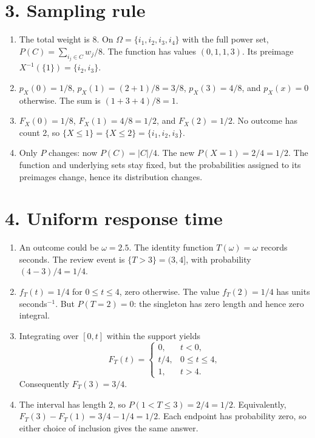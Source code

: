 \documentclass[11pt,a4paper]{article}
\begin{document}
\clearpage
\section*{3. Sampling rule}
\begin{enumerate}
\item The total weight is 8. On $\Omega=\{i_1,i_2,i_3,i_4\}$ with the full power set, $P(C)=\sum_{i_j\in C}w_j/8$. The function has values $(0,1,1,3)$. Its preimage $X^{-1}(\{1\})=\{i_2,i_3\}$.
\item $p_X(0)=1/8$, $p_X(1)=(2+1)/8=3/8$, $p_X(3)=4/8$, and $p_X(x)=0$ otherwise. The sum is $(1+3+4)/8=1$.
\item $F_X(0)=1/8$, $F_X(1)=4/8=1/2$, and $F_X(2)=1/2$. No outcome has count 2, so $\{X\le1\}=\{X\le2\}=\{i_1,i_2,i_3\}$.
\item Only $P$ changes: now $P(C)=|C|/4$. The new $P(X=1)=2/4=1/2$. The function and underlying sets stay fixed, but the probabilities assigned to its preimages change, hence its distribution changes.
\end{enumerate}

\section*{4. Uniform response time}
\begin{enumerate}
\item An outcome could be $\omega=2.5$. The identity function $T(\omega)=\omega$ records seconds. The review event is $\{T>3\}=(3,4]$, with probability $(4-3)/4=1/4$.
\item $f_T(t)=1/4$ for $0\le t\le4$, zero otherwise. The value $f_T(2)=1/4$ has units seconds$^{-1}$. But $P(T=2)=0$: the singleton has zero length and hence zero integral.
\item Integrating over $[0,t]$ within the support yields
\[F_T(t)=\begin{cases}0,&t<0,\\t/4,&0\le t\le4,\\1,&t>4.\end{cases}\]
Consequently $F_T(3)=3/4$.
\item The interval has length 2, so $P(1<T\le3)=2/4=1/2$. Equivalently, $F_T(3)-F_T(1)=3/4-1/4=1/2$. Each endpoint has probability zero, so either choice of inclusion gives the same answer.
\end{enumerate}

\clearpage
\end{document}
